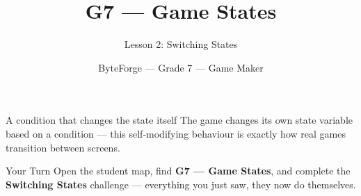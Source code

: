 \documentclass[aspectratio=169]{beamer}
\title{G7 — Game States}
\subtitle{Lesson 2: Switching States}
\author{ByteForge --- Grade 7 --- Game Maker}
\date{}
\begin{document}
\begin{frame}
    \titlepage
\end{frame}

\begin{frame}{A condition that changes the state itself}
    \Large
    The game changes its own state variable based on a condition — this self-modifying behaviour is exactly how real games transition between screens.
\end{frame}

\begin{frame}{Your Turn}
    \Large
    Open the student map, find \textbf{G7 — Game States}, and complete
    the \textbf{Switching States} challenge --- everything you just saw, they now do themselves.
\end{frame}
\end{document}
